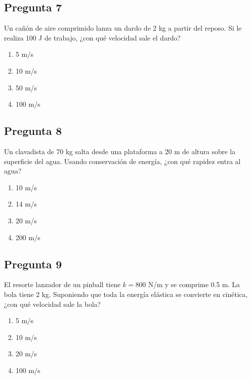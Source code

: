 \begin{preguntabox}
\subsection{Pregunta 7}
Un cañón de aire comprimido lanza un dardo de 2 kg a partir del reposo. Si le realiza 100 J de trabajo, ¿con qué velocidad sale el dardo?

\begin{enumerate}
    \item[A)] 5 m/s
    \item[B)] 10 m/s
    \item[C)] 50 m/s
    \item[D)] 100 m/s
\end{enumerate}
\end{preguntabox}

\begin{preguntabox}
\subsection{Pregunta 8}
Un clavadista de 70 kg salta desde una plataforma a 20 m de altura sobre la superficie del agua. Usando conservación de energía, ¿con qué rapidez entra al agua?

\begin{enumerate}
    \item[A)] 10 m/s
    \item[B)] 14 m/s
    \item[C)] 20 m/s
    \item[D)] 200 m/s
\end{enumerate}
\end{preguntabox}

\begin{preguntabox}
\subsection{Pregunta 9}
El resorte lanzador de un pinball tiene $k = 800$ N/m y se comprime 0.5 m. La bola tiene 2 kg. Suponiendo que toda la energía elástica se convierte en cinética, ¿con qué velocidad sale la bola?

\begin{enumerate}
    \item[A)] 5 m/s
    \item[B)] 10 m/s
    \item[C)] 20 m/s
    \item[D)] 100 m/s
\end{enumerate}
\end{preguntabox}

